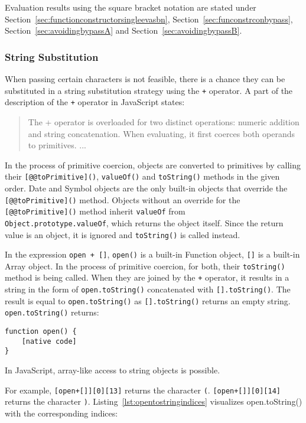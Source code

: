 Evaluation results using the square bracket notation are stated under Section~\ref{sec:functionconstructorsingleevasbn}, Section~\ref{sec:funconstrconbypass}, Section~\ref{sec:avoidingbypassA} and Section~\ref{sec:avoidingbypassB}.


\subsubsection{String Substitution}
\label{sec:stringreplace}
When passing certain characters is not feasible, there is a chance they can be substituted in a string substitution strategy using the \verb|+| operator.
A part of the description of the \verb|+| operator in JavaScript states:
\begin{quote}
	The + operator is overloaded for two distinct operations: numeric addition and string concatenation. When evaluating, it first coerces both operands to primitives. ... \cite{js/+}
\end{quote}
In the process of primitive coercion, objects are converted to primitives by calling their \verb|[@@toPrimitive]()|, \verb|valueOf()| and \verb|toString()| methods in the given order. Date and Symbol objects are the only built-in objects that override the \verb|[@@toPrimitive]()| method.
Objects without an override for the \verb|[@@toPrimitive]()| method inherit \verb|valueOf| from
\\ \verb|Object.prototype.valueOf|, which returns the object itself.
Since the return value is an object, it is ignored and \verb|toString()| is called instead. \cite{js/primitiveCoercion}

In the expression \verb|open + []|, \verb|open()| is a built-in Function object, \verb|[]| is a built-in Array object.
In the process of primitive coercion, for both, their \verb|toString()| method is being called.
When they are joined by the \verb|+| operator, it results in a string in the form of \verb|open.toString()| concatenated with \verb|[].toString()|. The result is equal to \verb|open.toString()| as \verb|[].toString()| returns an empty string.
\verb|open.toString()| returns:

\begin{lstlisting}[style=basicStyle]
function open() {
    [native code]
}
\end{lstlisting}

In JavaScript, array-like access to string objects is possible. \cite{js/stringbrackets}

For example, \verb|[open+[]][0][13]| returns the character \verb|(|. \verb|[open+[]][0][14]| returns the character \verb|)|. Listing~\ref{lst:opentostringindices} visualizes open.toString() with the corresponding indices:

